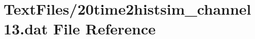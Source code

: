 \hypertarget{20time2histsim__channel13_8dat}{}\section{Text\+Files/20time2histsim\+\_\+channel13.dat File Reference}
\label{20time2histsim__channel13_8dat}
